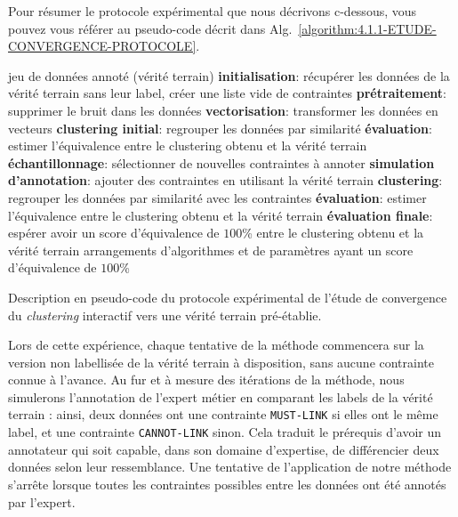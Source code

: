 			Pour résumer le protocole expérimental que nous décrivons c-dessous, vous pouvez vous référer au pseudo-code décrit dans Alg.~\ref{algorithm:4.1.1-ETUDE-CONVERGENCE-PROTOCOLE}.
			\begin{algorithm}[!htb]
				\begin{algorithmic}[1]
					\Require jeu de données annoté (vérité terrain)
						\State \textbf{initialisation}: récupérer les données de la vérité terrain sans leur label, créer une liste vide de contraintes
						\State \textbf{prétraitement}: supprimer le bruit dans les données
						\State \textbf{vectorisation}: transformer les données en vecteurs
						\State \textbf{clustering initial}: regrouper les données par similarité
						\State \textbf{évaluation}: estimer l'équivalence entre le clustering obtenu et la vérité terrain
						\Repeat
							\State \textbf{échantillonnage}: sélectionner de nouvelles contraintes à annoter
							\State \textbf{simulation d'annotation}: ajouter des contraintes en utilisant la vérité terrain
							\State \textbf{clustering}: regrouper les données par similarité avec les contraintes
							\State \textbf{évaluation}: estimer l'équivalence entre le clustering obtenu et la vérité terrain
						\State \textbf{évaluation finale}: espérer avoir un score d'équivalence de $100$\% entre le clustering obtenu et la vérité terrain
					\EndFor
					\Ensure arrangements d'algorithmes et de paramètres ayant un score d'équivalence de $100$\%
				\end{algorithmic}
				\caption{Description en pseudo-code du protocole expérimental de l'étude de convergence du \textit{clustering} interactif vers une vérité terrain pré-établie.}
				\label{algorithm:4.1.1-ETUDE-CONVERGENCE-PROTOCOLE}
			\end{algorithm}
			
			Lors de cette expérience, chaque tentative de la méthode commencera sur la version non labellisée de la vérité terrain à disposition, sans aucune contrainte connue à l'avance.
			Au fur et à mesure des itérations de la méthode, nous simulerons l'annotation de l'expert métier en comparant les labels de la vérité terrain : ainsi, deux données ont une contrainte \texttt{MUST-LINK} si elles ont le même label, et une contrainte \texttt{CANNOT-LINK} sinon. Cela traduit le prérequis d'avoir un annotateur qui soit capable, dans son domaine d'expertise,  de différencier deux données selon leur ressemblance.
			Une tentative de l'application de notre méthode s'arrête lorsque toutes les contraintes possibles entre les données ont été annotés par l'expert.

